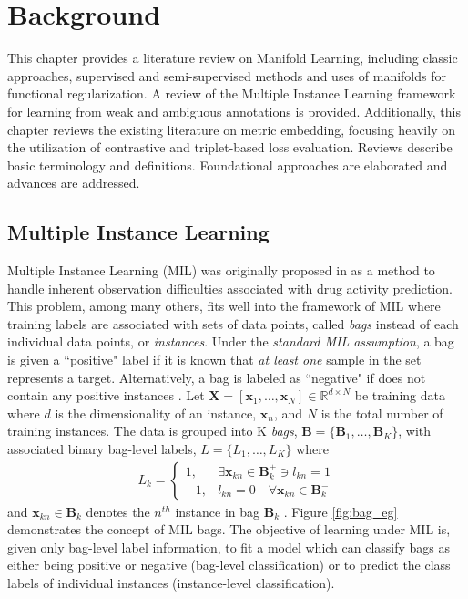 \chapter{Background}

This chapter provides a literature review on Manifold Learning, including classic approaches, supervised and semi-supervised methods and uses of manifolds for functional regularization.  A review of the Multiple Instance Learning framework for learning from weak and ambiguous annotations is provided. Additionally, this chapter reviews the existing literature on metric embedding, focusing heavily on the utilization of contrastive and triplet-based loss evaluation.  Reviews describe basic terminology and definitions.  Foundational approaches are elaborated and advances are addressed.

\section{Multiple Instance Learning}

Multiple Instance Learning (MIL) was originally proposed in \cite{Dietterich1996AxisParallelRectangles} as a method to handle inherent observation difficulties associated with drug activity prediction.  This problem, among many others, fits well into the framework of MIL where training labels are associated with sets of data points, called \textit{bags} instead of each individual data points, or \textit{instances}.  Under the \textit{standard MIL assumption}, a bag is given a ``positive" label if it is known that  \textit{at least one} sample in the set represents a target.  Alternatively, a bag is labeled as ``negative" if does not contain any positive instances \cite{Carbonneau2016MILSurvey}.  Let $\bm{X}=[\bm{x}_1,\dots, \bm{x}_N] \in \mathbb{R}^{d \times N}$ be training data where $d$ is the dimensionality of an instance, $\bm{x}_n$, and $N$ is the total number of training instances.  The data is grouped into K \textit{bags}, $\bm{B} = \{\bm{B}_1, \dots, \bm{B}_K\}$, with associated binary bag-level labels, $L = \{L_1, \dots, L_K \}$ where 
\begin{align}
	L_k = \begin{cases} 
	1, & \exists \bm{x}_{kn} \in \bm{B}^{+}_{k} \ni  l_{kn} = 1\\
	-1, & l_{kn} = 0 \quad \forall \bm{x}_{kn} \in \bm{B}^{-}_{k} 
	\end{cases}
\end{align} and $\bm{x}_{kn} \in \bm{B}_k$ denotes the $n^{th}$ instance in bag $\bm{B}_k$ \cite{Zare2016MIACE}.  Figure \ref{fig:bag_eg} demonstrates the concept of MIL bags.  The objective of learning under MIL is, given only bag-level label information, to fit a model which can classify bags as either being positive or negative (bag-level classification) or to predict the class labels of individual instances (instance-level classification).

